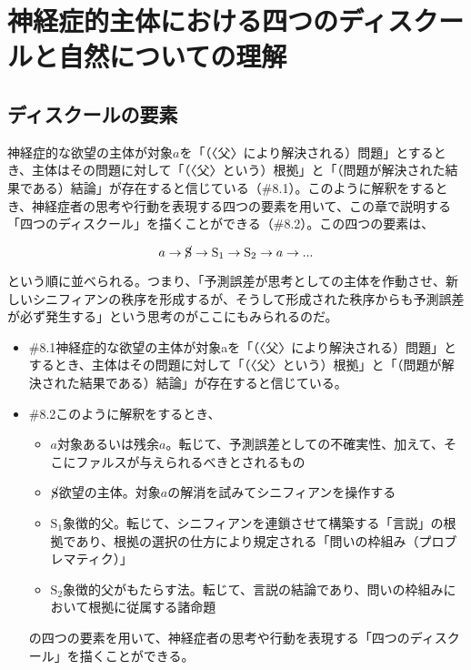 \section{神経症的主体における四つのディスクールと自然についての理解}\label{ux795eux7d4cux75c7ux7684ux4e3bux4f53ux306bux304aux3051ux308bux56dbux3064ux306eux30c7ux30a3ux30b9ux30afux30fcux30ebux3068ux81eaux7136ux306bux3064ux3044ux3066ux306eux7406ux89e3}

\subsection{ディスクールの要素}\label{ux30c7ux30a3ux30b9ux30afux30fcux30ebux306eux8981ux7d20}

神経症的な欲望の主体が対象\(a\)を「（〈父〉により解決される）問題」とするとき、主体はその問題に対して「（〈父〉という）根拠」と「（問題が解決された結果である）結論」が存在すると信じている（\#8.1）。このように解釈をするとき、神経症者の思考や行動を表現する四つの要素を用いて、この章で説明する「四つのディスクール」を描くことができる（\#8.2）。この四つの要素は、

\[a \rightarrow \cancel{\textrm{S}} \rightarrow \textrm{S}_1 \rightarrow \textrm{S}_2 \rightarrow a \rightarrow ...\]

という順に並べられる。つまり、「予測誤差が思考としての主体を作動させ、新しいシニフィアンの秩序を形成するが、そうして形成された秩序からも予測誤差が必ず発生する」という思考のがここにもみられるのだ。

\begin{note}{}
  \begin{itemize}
    \tightlist
    \item{\#8.1}神経症的な欲望の主体が対象aを「（〈父〉により解決される）問題」とするとき、主体はその問題に対して「（〈父〉という）根拠」と「（問題が解決された結果である）結論」が存在すると信じている。
    \item{\#8.2}このように解釈をするとき、
      \begin{itemize}
        \tightlist
        \item{$a$}対象あるいは残余$a$。転じて、予測誤差としての不確実性、加えて、そこにファルスが与えられるべきとされるもの
        \item{$\cancel{\textrm{S}}$}欲望の主体。対象$a$の解消を試みてシニフィアンを操作する
        \item{$\textrm{S}_1$}象徴的父。転じて、シニフィアンを連鎖させて構築する「言説」の根拠であり、根拠の選択の仕方により規定される「問いの枠組み（プロブレマティク）」
        \item{$\textrm{S}_2$}象徴的父がもたらす法。転じて、言説の結論であり、問いの枠組みにおいて根拠に従属する諸命題
      \end{itemize}の四つの要素を用いて、神経症者の思考や行動を表現する「四つのディスクール」を描くことができる。
  \end{itemize}
\end{note}

